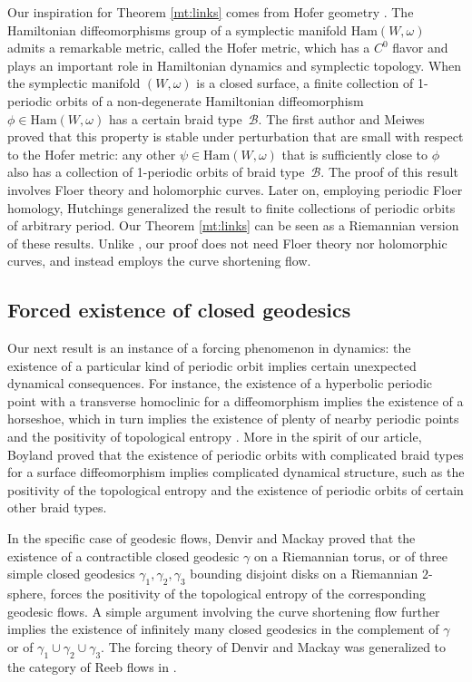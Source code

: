 Our inspiration for Theorem \ref{mt:links} comes from Hofer geometry \cite{Hofer:1990aa, Polterovich:2001aa}. The Hamiltonian diffeomorphisms group of a symplectic manifold $\mathrm{Ham}(W,\omega)$ admits a remarkable metric, called the Hofer metric, which has a $C^0$ flavor and plays an important role in Hamiltonian dynamics and symplectic topology. When the symplectic manifold $(W,\omega)$ is a closed surface,
a finite collection of 1-periodic orbits of a non-degenerate Hamiltonian diffeomorphism $\phi\in\mathrm{Ham}(W,\omega)$ has a certain braid type~$\mathcal B$. The first author and Meiwes \cite{Alves:2021aa} proved that this property is stable under perturbation that are small with respect to the Hofer metric: any other $\psi\in\mathrm{Ham}(W,\omega)$ that is sufficiently close to $\phi$ also has a collection of 1-periodic orbits of braid type~$\mathcal B$. The proof of this result involves Floer theory and holomorphic curves. Later on, employing periodic Floer homology, Hutchings \cite{Hutchings:2023aa} generalized the result to finite collections of periodic orbits of arbitrary period.
Our Theorem \ref{mt:links} can be seen as a Riemannian version of these results. Unlike \cite{Alves:2021aa, Hutchings:2023aa}, our proof does not need Floer theory nor holomorphic curves, and instead employs the curve shortening flow.

\subsection{Forced existence of closed geodesics}

Our next result is an instance of a forcing phenomenon in dynamics: the existence of a particular kind of periodic orbit implies certain unexpected dynamical consequences. For instance, the existence of a hyperbolic periodic point with a transverse homoclinic for a diffeomorphism implies the existence of a horseshoe, which in turn implies the existence of plenty of nearby periodic points and the positivity of topological entropy \cite[Th.\,6.5.5]{Katok:1995aa}. More in the spirit of our article, Boyland \cite{Boyland:1994aa} proved that the existence of periodic orbits with complicated braid types for a surface diffeomorphism implies complicated dynamical structure, such as the positivity of the topological entropy and the existence of periodic orbits of certain other braid types.

In the specific case of geodesic flows, Denvir and Mackay \cite{Denvir:1998aa} proved that the existence of a contractible closed geodesic $\gamma$ on a Riemannian torus, or of three simple closed geodesics $\gamma_1,\gamma_2,\gamma_3$ bounding disjoint disks on a Riemannian $2$-sphere, forces the positivity of the topological entropy of the corresponding geodesic flows. A simple argument involving the curve shortening flow further implies the existence of infinitely many closed geodesics in the complement of $\gamma$ or of $\gamma_1\cup\gamma_2\cup\gamma_3$. The forcing theory of Denvir and Mackay was generalized to the category of Reeb flows in \cite{Alves:2022ab,Pirnapasov:2021}.

